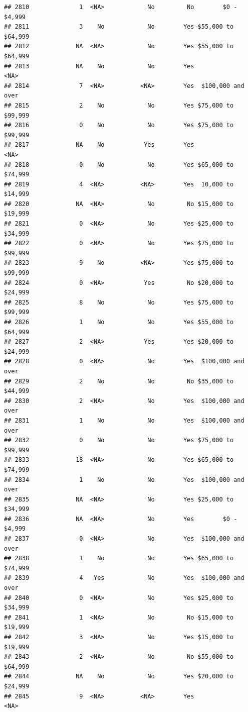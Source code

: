 \documentclass[man]{apa6}
\begin{document}
\begin{verbatim}
## 2810              1  <NA>            No         No        $0 - $4,999
## 2811              3    No            No        Yes $55,000 to $64,999
## 2812             NA  <NA>            No        Yes $55,000 to $64,999
## 2813             NA    No            No        Yes               <NA>
## 2814              7  <NA>          <NA>        Yes  $100,000 and over
## 2815              2    No            No        Yes $75,000 to $99,999
## 2816              0    No            No        Yes $75,000 to $99,999
## 2817             NA    No           Yes        Yes               <NA>
## 2818              0    No            No        Yes $65,000 to $74,999
## 2819              4  <NA>          <NA>        Yes  10,000 to $14,999
## 2820             NA  <NA>            No         No $15,000 to $19,999
## 2821              0  <NA>            No        Yes $25,000 to $34,999
## 2822              0  <NA>            No        Yes $75,000 to $99,999
## 2823              9    No          <NA>        Yes $75,000 to $99,999
## 2824              0  <NA>           Yes         No $20,000 to $24,999
## 2825              8    No            No        Yes $75,000 to $99,999
## 2826              1    No            No        Yes $55,000 to $64,999
## 2827              2  <NA>           Yes        Yes $20,000 to $24,999
## 2828              0  <NA>            No        Yes  $100,000 and over
## 2829              2    No            No         No $35,000 to $44,999
## 2830              2  <NA>            No        Yes  $100,000 and over
## 2831              1    No            No        Yes  $100,000 and over
## 2832              0    No            No        Yes $75,000 to $99,999
## 2833             18  <NA>            No        Yes $65,000 to $74,999
## 2834              1    No            No        Yes  $100,000 and over
## 2835             NA  <NA>            No        Yes $25,000 to $34,999
## 2836             NA  <NA>            No        Yes        $0 - $4,999
## 2837              0  <NA>            No        Yes  $100,000 and over
## 2838              1    No            No        Yes $65,000 to $74,999
## 2839              4   Yes            No        Yes  $100,000 and over
## 2840              0  <NA>            No        Yes $25,000 to $34,999
## 2841              1  <NA>            No         No $15,000 to $19,999
## 2842              3  <NA>            No        Yes $15,000 to $19,999
## 2843              2  <NA>            No         No $55,000 to $64,999
## 2844             NA    No            No        Yes $20,000 to $24,999
## 2845              9  <NA>          <NA>        Yes               <NA>

\end{verbatim}
\end{document}

